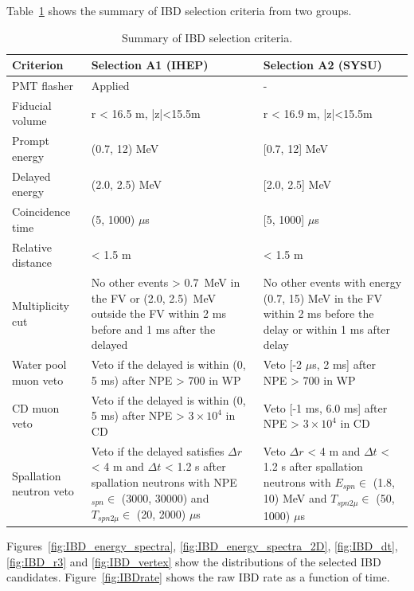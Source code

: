 Table~\ref{tab:ibd_selection} shows the summary of IBD selection criteria from two groups.
\begin{table}[!htbp]
    \caption{Summary of IBD selection criteria.}
    \label{tab:IbdSel}
    \centering
    \footnotesize%
    \setlength{\tabcolsep}{4pt}%
    \renewcommand{\arraystretch}{1.2}%
    \begin{tabular}{lm{6cm}m{6cm}}
        \hline
        Criterion & Selection A1 (IHEP) & Selection A2 (SYSU) \\ 
        \hline
        PMT flasher & Applied & - \\
        Fiducial volume & r < 16.5 m, |z|<15.5m & r < 16.9 m, |z|<15.5m \\
        Prompt energy  & (0.7, 12) MeV & [0.7, 12] MeV \\
        Delayed energy & (2.0, 2.5) MeV & [2.0, 2.5] MeV\\
        Coincidence time & (5, 1000) $\mu$s & [5, 1000] $\mu$s \\
        Relative distance & < 1.5 m & < 1.5 m \\
        Multiplicity cut & No other events > 0.7~MeV in the FV or (2.0, 2.5)~MeV outside the FV within 2 ms before  and 1 ms after the delayed & No other events with energy (0.7, 15) MeV in the FV within 2 ms before the delay or within 1 ms after delay \\
        Water pool muon veto & Veto if the delayed is within (0, 5 ms) after NPE > 700 in WP & Veto [-2 $\mu$s, 2 ms] after NPE > 700 in WP \\
        CD muon veto & Veto if the delayed is within (0, 5 ms) after NPE > $3 \times 10^{4}$ in CD & Veto [-1 ms, 6.0 ms] after NPE > $3 \times 10^{4}$ in CD \\
        Spallation neutron veto & Veto if the delayed satisfies $\Delta r$ < 4 m and $\Delta t$ < 1.2 s after spallation neutrons with NPE$_{spn} \in$ (3000, 30000) and $T_{spn2\mu} \in$ (20, 2000) $\mu$s & Veto $\Delta r$ < 4 m and $\Delta t$ < 1.2 s after spallation neutrons  with $E_{spn} \in$ (1.8, 10) MeV and $T_{spn2\mu} \in$ (50, 1000) $\mu$s \\
        \hline
    \end{tabular}
    \label{tab:ibd_selection}
\end{table}

Figures~\ref{fig:IBD_energy_spectra}, \ref{fig:IBD_energy_spectra_2D}, \ref{fig:IBD_dt}, \ref{fig:IBD_r3} and \ref{fig:IBD_vertex} show the distributions of the selected IBD candidates. Figure~\ref{fig:IBDrate} shows the raw IBD rate as a function of time.

